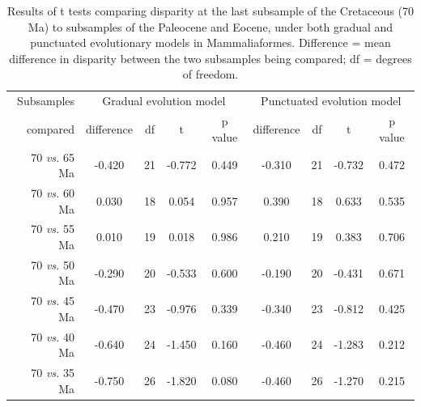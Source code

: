 \documentclass[12pt,letterpaper]{article}
\begin{document}
\begin{table}[ht]
\caption{Results of t tests comparing disparity at the last subsample of the Cretaceous (70 Ma) to subsamples of the Paleocene and Eocene, under both gradual and punctuated evolutionary models in Mammaliaformes. Difference = mean difference in disparity between the two subsamples being compared; df = degrees of freedom. }
\label{tab:Tab_slater}
\centering
\begin{tabular}{r|cccc|cccc}
  \hline
  Subsamples & \multicolumn{4}{c|}{Gradual evolution model} & \multicolumn{4}{c}{Punctuated evolution model} \\
  compared & difference & df & t & p value & difference & df & t & p value \\ 
  \hline
  70 \textit{vs.} 65 Ma & -0.420 & 21 & -0.772 & 0.449 & -0.310 & 21 & -0.732 & 0.472 \\ 
  70 \textit{vs.} 60 Ma & 0.030 & 18 & 0.054 & 0.957 & 0.390 & 18 & 0.633 & 0.535 \\ 
  70 \textit{vs.} 55 Ma & 0.010 & 19 & 0.018 & 0.986 & 0.210 & 19 & 0.383 & 0.706 \\ 
  70 \textit{vs.} 50 Ma & -0.290 & 20 & -0.533 & 0.600 & -0.190 & 20 & -0.431 & 0.671 \\ 
  70 \textit{vs.} 45 Ma & -0.470 & 23 & -0.976 & 0.339 & -0.340 & 23 & -0.812 & 0.425 \\ 
  70 \textit{vs.} 40 Ma & -0.640 & 24 & -1.450 & 0.160 & -0.460 & 24 & -1.283 & 0.212 \\ 
  70 \textit{vs.} 35 Ma & -0.750 & 26 & -1.820 & 0.080 & -0.460 & 26 & -1.270 & 0.215 \\ 
   \hline
\end{tabular}
\end{table}
\end{document}
